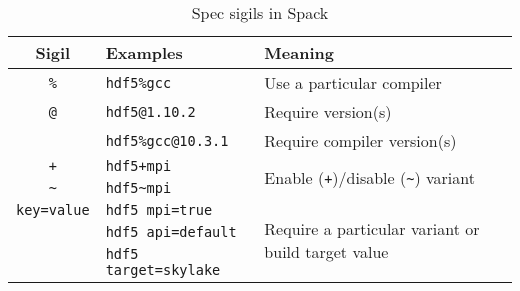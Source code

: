 

\begin{table}
  \centering
  \footnotesize
  \begin{tabular}{|c|l|p{3.5cm}|}
    \hline
    \textbf{Sigil} & \textbf{Examples} & \textbf{Meaning} \\
    \hline\hline
    \texttt{\%} & \texttt{hdf5\%gcc}    & Use a particular compiler \\
    \hline
    \texttt{@}  & \texttt{hdf5@1.10.2}  & Require version(s) \\
    & \texttt{hdf5\%gcc@10.3.1} & Require compiler version(s) \\
    \hline
    \texttt{+}  & \texttt{hdf5+mpi}     & \multirow{2}{3.5cm}{Enable (\texttt{+})/disable (\texttt{\~{}}) variant} \\
    \texttt{\~} & \texttt{hdf5\~{}mpi} &    \\
    \hline
    \texttt{key=value} & \texttt{hdf5 mpi=true} & \multirow{3}{3.5cm}{Require a particular variant or build target value} \\
    & \texttt{hdf5 api=default} &      \\
    & \texttt{hdf5 target=skylake} &  \\
    \hline
  \end{tabular}
  \caption[Table caption text]{
    Spec sigils in Spack
    \label{tab:sigil}
    \vspace{-1em}
  }
\end{table}
